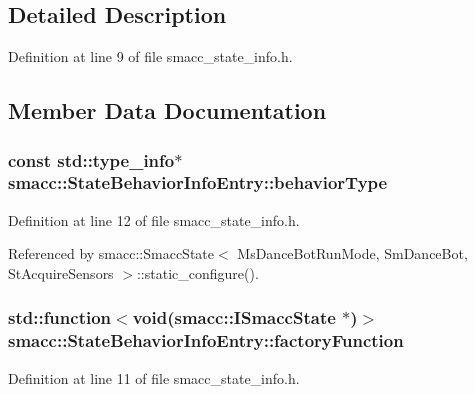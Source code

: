 \subsection{Detailed Description}


Definition at line 9 of file smacc\+\_\+state\+\_\+info.\+h.



\subsection{Member Data Documentation}
\subsubsection[{\texorpdfstring{behavior\+Type}{behaviorType}}]{\setlength{\rightskip}{0pt plus 5cm}const std\+::type\+\_\+info$\ast$ smacc\+::\+State\+Behavior\+Info\+Entry\+::behavior\+Type}\hypertarget{structsmacc_1_1StateBehaviorInfoEntry_a9f77a396b80171e010b3c30778b2f3f0}{}\label{structsmacc_1_1StateBehaviorInfoEntry_a9f77a396b80171e010b3c30778b2f3f0}


Definition at line 12 of file smacc\+\_\+state\+\_\+info.\+h.



Referenced by smacc\+::\+Smacc\+State$<$ Ms\+Dance\+Bot\+Run\+Mode, Sm\+Dance\+Bot, St\+Acquire\+Sensors $>$\+::static\+\_\+configure().

\subsubsection[{\texorpdfstring{factory\+Function}{factoryFunction}}]{\setlength{\rightskip}{0pt plus 5cm}std\+::function$<$void({\bf smacc\+::\+I\+Smacc\+State} $\ast$)$>$ smacc\+::\+State\+Behavior\+Info\+Entry\+::factory\+Function}\hypertarget{structsmacc_1_1StateBehaviorInfoEntry_a0af2d6aabb921c95fd723b554cc21aa9}{}\label{structsmacc_1_1StateBehaviorInfoEntry_a0af2d6aabb921c95fd723b554cc21aa9}


Definition at line 11 of file smacc\+\_\+state\+\_\+info.\+h.



